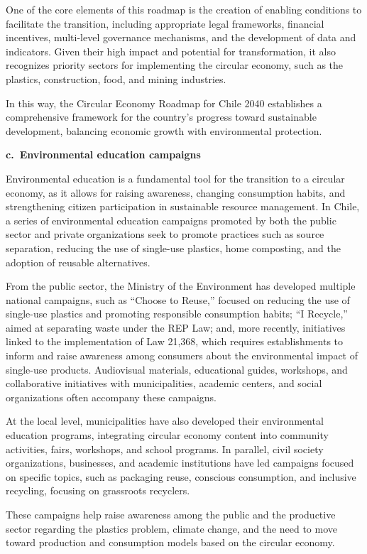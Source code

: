 \documentclass[
  12pt,
  oneside]{book}
\begin{document}
One of the core elements of this roadmap is the creation of enabling
conditions to facilitate the transition, including appropriate legal
frameworks, financial incentives, multi-level governance mechanisms, and
the development of data and indicators. Given their high impact and
potential for transformation, it also recognizes priority sectors for
implementing the circular economy, such as the plastics, construction,
food, and mining industries.

In this way, the Circular Economy Roadmap for Chile 2040 establishes a
comprehensive framework for the country's progress toward sustainable
development, balancing economic growth with environmental protection.

\textbf{c.~Environmental education campaigns}

Environmental education is a fundamental tool for the transition to a
circular economy, as it allows for raising awareness, changing
consumption habits, and strengthening citizen participation in
sustainable resource management. In Chile, a series of environmental
education campaigns promoted by both the public sector and private
organizations seek to promote practices such as source separation,
reducing the use of single-use plastics, home composting, and the
adoption of reusable alternatives.

From the public sector, the Ministry of the Environment has developed
multiple national campaigns, such as ``Choose to Reuse,'' focused on
reducing the use of single-use plastics and promoting responsible
consumption habits; ``I Recycle,'' aimed at separating waste under the
REP Law; and, more recently, initiatives linked to the implementation of
Law 21,368, which requires establishments to inform and raise awareness
among consumers about the environmental impact of single-use products.
Audiovisual materials, educational guides, workshops, and collaborative
initiatives with municipalities, academic centers, and social
organizations often accompany these campaigns.

At the local level, municipalities have also developed their
environmental education programs, integrating circular economy content
into community activities, fairs, workshops, and school programs. In
parallel, civil society organizations, businesses, and academic
institutions have led campaigns focused on specific topics, such as
packaging reuse, conscious consumption, and inclusive recycling,
focusing on grassroots recyclers.

These campaigns help raise awareness among the public and the productive
sector regarding the plastics problem, climate change, and the need to
move toward production and consumption models based on the circular
economy.
\end{document}
